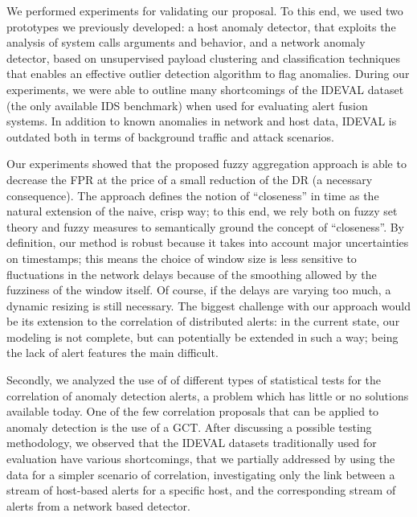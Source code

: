 We performed experiments for validating our proposal. To this end, we used two prototypes we previously developed: a host anomaly detector, that exploits the analysis of system calls arguments and behavior, and a network anomaly detector, based on unsupervised payload clustering and classification techniques that enables an effective outlier detection algorithm to flag anomalies. During our experiments, we were able to outline many shortcomings of the \ac{IDEVAL} dataset (the only available \ac{IDS} benchmark) when used for evaluating alert fusion systems. In addition to known anomalies in network and host data, \ac{IDEVAL} is outdated both in terms of background traffic and attack scenarios.

Our experiments showed that the proposed fuzzy aggregation approach is able to decrease the \ac{FPR} at the price of a small reduction of the \ac{DR} (a necessary consequence). The approach defines the notion of ``closeness'' in time as the natural extension of the naive, crisp way; to this end, we rely both on fuzzy set theory and fuzzy measures to semantically ground the concept of ``closeness''. By definition, our method is robust because it takes into account major uncertainties on timestamps; this means the choice of window size is less sensitive to fluctuations in the network delays because of the smoothing allowed by the fuzziness of the window itself. Of course, if the delays are varying too much, a dynamic resizing is still necessary. The biggest challenge with our approach would be its extension to the correlation of distributed alerts: in the current state, our modeling is not complete, but can potentially be extended in such a way; being the lack of alert features the main difficult.

Secondly, we analyzed the use of of different types of statistical tests for the correlation of anomaly detection alerts, a problem which has little or no solutions available today. One of the few correlation proposals that can be applied to anomaly detection is the use of a \ac{GCT}. After discussing a possible testing methodology, we observed that the \ac{IDEVAL} datasets traditionally used for evaluation have various shortcomings, that we partially addressed by using the data for a simpler scenario of correlation, investigating only the link between a stream of host-based alerts for a specific host, and the corresponding stream of alerts from a network based detector.

